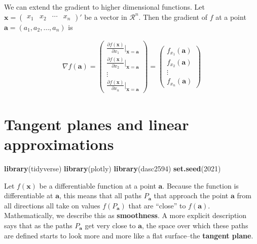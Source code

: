 \documentclass[
]{book}
\newenvironment{Shaded}{\begin{snugshade}}{\end{snugshade}}
\newcommand{\DecValTok}[1]{\textcolor[rgb]{0.00,0.00,0.81}{#1}}
\newcommand{\KeywordTok}[1]{\textcolor[rgb]{0.13,0.29,0.53}{\textbf{#1}}}
\newcommand{\NormalTok}[1]{#1}
\theoremstyle{definition}
\theoremstyle{definition}
\theoremstyle{definition}
\theoremstyle{definition}
\theoremstyle{remark}
\begin{document}
We can extend the gradient to higher dimensional functions. Let \(\mathbf{x} = \begin{pmatrix} x_1 & x_2 & \cdots & x_n \end{pmatrix}'\) be a vector in \(\mathcal{R}^n\). Then the gradient of \(f\) at a point \(\mathbf{a} = (a_1, a_2, \ldots, a_n)\) is

\[
\begin{aligned}
 \nabla f(\mathbf{a}) = \begin{pmatrix} \frac{\partial f(\mathbf{x})}{\partial x_1}|_{\mathbf{x} = \mathbf{a}} \\ \frac{\partial f(\mathbf{x})}{\partial x_2}|_{\mathbf{x} = \mathbf{a}} \\  \vdots \\ \frac{\partial f(\mathbf{x})}{\partial x_n}|_{\mathbf{x} = \mathbf{a}} \end{pmatrix} = \begin{pmatrix} f_{x_1}(\mathbf{a}) \\ f_{x_2}(\mathbf{a}) \\  \vdots \\ f_{x_n}(\mathbf{a}) \end{pmatrix} 
\end{aligned}
\]

\hypertarget{tangent-planes-and-linear-approximations}{%
\chapter{Tangent planes and linear approximations}\label{tangent-planes-and-linear-approximations}}

\begin{Shaded}
\begin{Highlighting}[]
\KeywordTok{library}\NormalTok{(tidyverse)}
\KeywordTok{library}\NormalTok{(plotly)}
\KeywordTok{library}\NormalTok{(dasc2594)}
\KeywordTok{set.seed}\NormalTok{(}\DecValTok{2021}\NormalTok{)}
\end{Highlighting}
\end{Shaded}

Let \(f(\mathbf{x})\) be a differentiable function at a point \(\mathbf{a}\). Because the function is differentiable at \(\mathbf{a}\), this means that all paths \(P_\mathbf{a}\) that approach the point \(\mathbf{a}\) from all directions all take on values \(f(P_\mathbf{a})\) that are ``close'' to \(f(\mathbf{a})\). Mathematically, we describe this as \textbf{smoothness}. A more explicit description says that as the paths \(P_{\mathbf{a}}\) get very close to \(\mathbf{a}\), the space over which these paths are defined starts to look more and more like a flat surface--the \textbf{tangent plane}.
\end{document}
